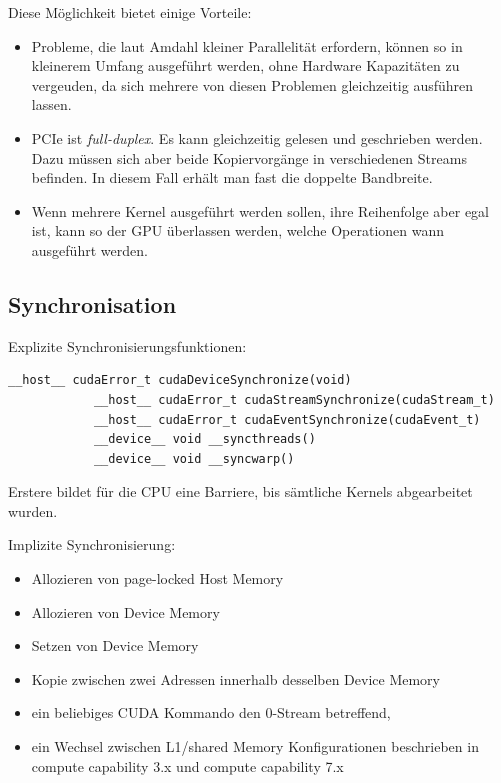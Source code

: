 		Diese Möglichkeit bietet einige Vorteile:
		\begin{itemize}
		    \item Probleme, die laut Amdahl kleiner Parallelität erfordern, können so in kleinerem Umfang ausgeführt werden, ohne Hardware Kapazitäten zu vergeuden, da sich mehrere von diesen Problemen gleichzeitig ausführen lassen.
		    \item PCIe ist \textit{full-duplex}. Es kann gleichzeitig gelesen und geschrieben werden. Dazu müssen sich aber beide Kopiervorgänge in verschiedenen Streams befinden. In diesem Fall erhält man fast die doppelte Bandbreite.
		    \item Wenn mehrere \Gls{Kernel} ausgeführt werden sollen, ihre Reihenfolge aber egal ist, kann so der GPU überlassen werden, welche Operationen wann ausgeführt werden.
		\end{itemize}
		
		
		\subsection{Synchronisation}\label{sync}
		Explizite Synchronisierungsfunktionen:
		
		\begin{lstlisting}[caption=Explizite Synchronisierung]
			__host__ cudaError_t cudaDeviceSynchronize(void)
			__host__ cudaError_t cudaStreamSynchronize(cudaStream_t)
			__host__ cudaError_t cudaEventSynchronize(cudaEvent_t)	
			__device__ void __syncthreads()
			__device__ void __syncwarp()
		\end{lstlisting}
		Erstere bildet für die CPU eine Barriere, bis sämtliche Kernels abgearbeitet wurden.
		
		Implizite Synchronisierung:
		\begin{itemize}
        	    \item Allozieren von page-locked Host Memory 
			\item Allozieren von Device Memory
			\item Setzen von Device Memory 
			\item Kopie zwischen zwei Adressen innerhalb desselben Device Memory
			\item ein beliebiges CUDA Kommando den 0-\Gls{Stream} betreffend,
			\item ein Wechsel zwischen L1/\gls{shared Memory} Konfigurationen beschrieben in \gls{compute capability} 3.x und \gls{compute capability} 7.x
		\end{itemize}
		
